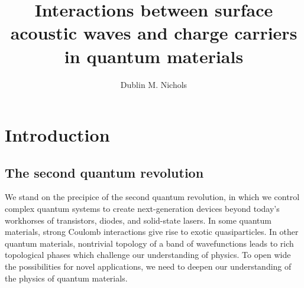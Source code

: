 \documentclass[double,12pt,1in,seploa]{beavtex}
\title{Interactions between surface acoustic waves and charge carriers in quantum materials}
\author{Dublin M. Nichols}
\let\Oldsection\section
\renewcommand{\section}{\FloatBarrier\Oldsection}
\begin{document}
\maketitle
\mainmatter




\chapter{Introduction}

\section{The second quantum revolution}

We stand on the precipice of the second quantum revolution, in which we control complex quantum systems to create next-generation devices beyond today's workhorses of transistors, diodes, and solid-state lasers. In some quantum materials, strong Coulomb interactions give rise to exotic quasiparticles. In other quantum materials, nontrivial topology of a band of wavefunctions leads to rich topological phases which challenge our understanding of physics. To open wide the possibilities for novel applications, we need to deepen our understanding of the physics of quantum materials.
\end{document}
